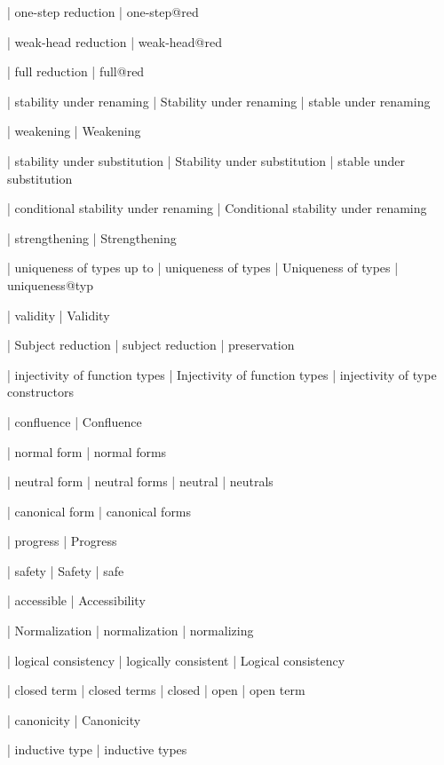   | one-step reduction
  | one-step@red

  | weak-head reduction
  | weak-head@red

  | full reduction
  | full@red

  | stability under renaming
  | Stability under renaming
  | stable under renaming

  | weakening
  | Weakening

  | stability under substitution
  | Stability under substitution
  | stable under substitution

  | conditional stability under renaming
  | Conditional stability under renaming


  | strengthening
  | Strengthening

  | uniqueness of types up to
  | uniqueness of types
  | Uniqueness of types
  | uniqueness@typ

  | validity
  | Validity

  | Subject reduction
  | subject reduction
  | preservation

  | injectivity of function types
  | Injectivity of function types
  | injectivity of type constructors

  | confluence
  | Confluence

  | normal form
  | normal forms

  | neutral form
  | neutral forms
  | neutral
  | neutrals

  | canonical form
  | canonical forms

  | progress
  | Progress

  | safety
  | Safety
  | safe

  | accessible
  | Accessibility

  | Normalization
  | normalization
  | normalizing

  | logical consistency
  | logically consistent
  | Logical consistency

  | closed term
  | closed terms
  | closed
  | open
  | open term

  | canonicity
  | Canonicity

  | inductive type
  | inductive types

